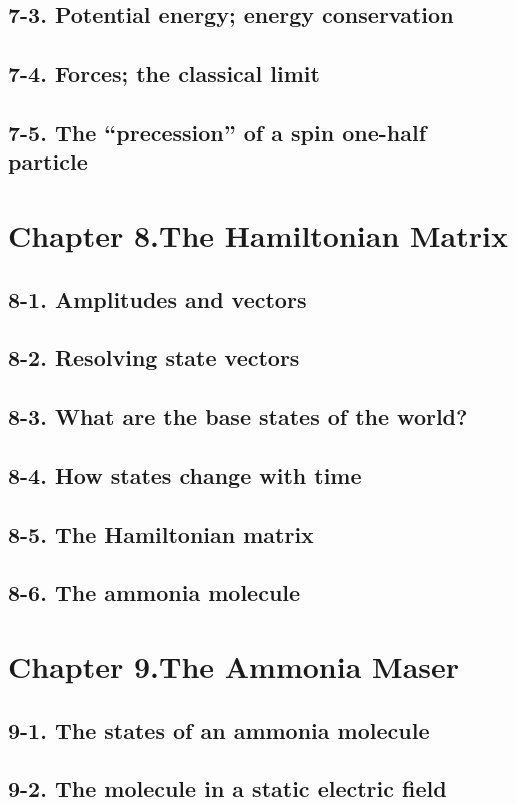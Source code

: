 \documentclass{article}
\begin{document}
\subsection{7-3. Potential energy; energy conservation}
\subsection{7-4. Forces; the classical limit}
\subsection{7-5. The “precession” of a spin one-half particle}
\section{Chapter 8.The Hamiltonian Matrix}
\subsection{8-1. Amplitudes and vectors}
\subsection{8-2. Resolving state vectors}
\subsection{8-3. What are the base states of the world?}
\subsection{8-4. How states change with time}
\subsection{8-5. The Hamiltonian matrix}
\subsection{8-6. The ammonia molecule}
\section{Chapter 9.The Ammonia Maser}
\subsection{9-1. The states of an ammonia molecule}
\subsection{9-2. The molecule in a static electric field}
\end{document}
